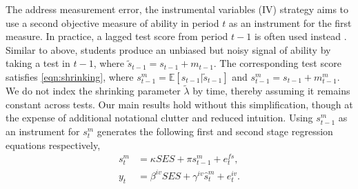 The address measurement error, the instrumental variables (IV) strategy aims to use a second objective measure of ability in period $t$ as an instrument for the first measure. In practice, a lagged test score from period $t-1$ is often used instead \citep{botelho2015racial,ferman2022assessing,zhu2024}. Similar to above, students produce an unbiased but noisy signal of ability by taking a test in $t-1$, where $\widetilde{s}_{t-1} = s_{t-1}+m_{t-1}$. The corresponding test score satisfies \eqref{eqn:shrinking}, where $s_{t-1}^m=\mathbb{E}[s_{t-1}|\widetilde{s}_{t-1}]$ and $s^m_{t-1}=s_{t-1}+m^m_{t-1}$. We do not index the shrinking parameter $\widetilde{\lambda}$ by time, thereby assuming it remains constant across tests. Our main results hold without this simplification, though at the expense of additional notational clutter and reduced intuition. Using $s_{t-1}^m$ as an instrument for $s_{t}^m$ generates the following first and second stage regression equations respectively,
\begin{align}
    \label{eqn:fs}
    s_{t}^m &= \kappa SES + \pi s_{t-1}^m+e_t^{fs},\\
    \label{eqn:ss}
    y_t &= \beta^{iv} SES + \gamma^{iv} \widehat{s}_{t}^m +e_{t}^{iv}.
\end{align}

